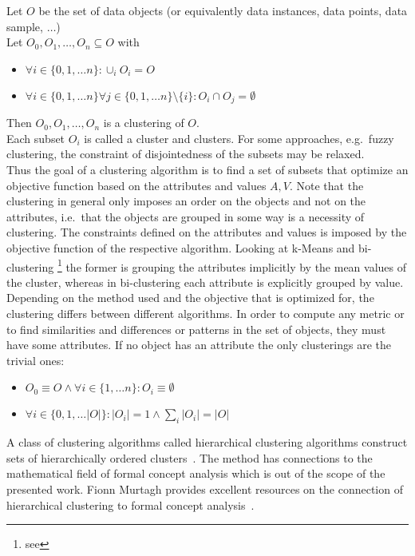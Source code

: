 Let $O$  be the set of data objects (or equivalently data instances, data points, data sample, $\dots$) \\
Let $O_0, O_1, \dots, O_n \subseteq O$ with
\begin{itemize}
    \item $\forall i \in \{0, 1, \dots n\}: \cup_i O_i = O$
    \item $\forall i \in \{0, 1, \dots n\} \forall j \in \{0, 1, \dots n\}\setminus\{i\}: O_i \cap O_j =\emptyset$
\end{itemize}
Then $O_0, O_1, \dots, O_n$ is a clustering of $O$. \\
Each subset $O_i$ is called a cluster and clusters. For some approaches, e.g.~fuzzy clustering, the constraint of disjointedness of the subsets may be relaxed. \\

Thus the goal of a clustering algorithm is to find a set of subsets that optimize an objective function based on the attributes and values $A, V$. Note that the clustering in general only imposes an order on the objects and not on the attributes, i.e.~that the objects are grouped in some way is a necessity of clustering. The constraints defined on the attributes and values is imposed by the objective function of the respective algorithm. Looking at k-Means and bi-clustering \footnote{see } the former is grouping the attributes implicitly by the mean values of the cluster, whereas in bi-clustering each attribute is explicitly grouped by value. \\

\noindent Depending on the method used and the objective that is optimized for, the clustering differs between different algorithms. 
In order to compute any metric or to find similarities and differences or patterns in the set of objects, they must have some attributes. If no object has an attribute the only clusterings are the trivial ones: 
\begin{itemize}
    \item $O_0 \equiv O \wedge \forall i \in \{1, \dots n\}: O_i \equiv \emptyset$
    \item $\forall i \in \{0, 1, \dots |O|\}: |O_i| = 1 \wedge \sum_i |O_i| = |O|$
\end{itemize}

\noindent A class of clustering algorithms called hierarchical clustering algorithms construct sets of hierarchically ordered clusters~\cite{Murtagh_2012}. The method has connections to the mathematical field of formal concept analysis which is out of the scope of the presented work. Fionn Murtagh provides excellent resources on the connection of hierarchical clustering to formal concept analysis~\cite{murtagh2010ultrametric, Murtagh_2012}. \\

